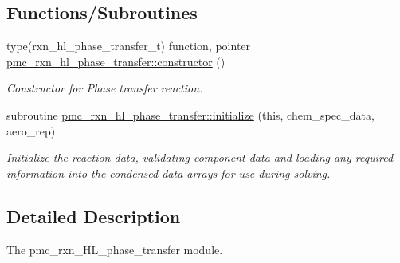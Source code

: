 \subsection*{Functions/\+Subroutines}
\begin{DoxyCompactItemize}
\item 
type(rxn\+\_\+hl\+\_\+phase\+\_\+transfer\+\_\+t) function, pointer \mbox{\hyperlink{namespacepmc__rxn__hl__phase__transfer_a1d307b730caaec01f18e464b315042a1}{pmc\+\_\+rxn\+\_\+hl\+\_\+phase\+\_\+transfer\+::constructor}} ()
\begin{DoxyCompactList}\small\item\em Constructor for Phase transfer reaction. \end{DoxyCompactList}\item 
subroutine \mbox{\hyperlink{namespacepmc__rxn__hl__phase__transfer_a0a981521812601400c9e9d40e803e40e}{pmc\+\_\+rxn\+\_\+hl\+\_\+phase\+\_\+transfer\+::initialize}} (this, chem\+\_\+spec\+\_\+data, aero\+\_\+rep)
\begin{DoxyCompactList}\small\item\em Initialize the reaction data, validating component data and loading any required information into the condensed data arrays for use during solving. \end{DoxyCompactList}\end{DoxyCompactItemize}


\subsection{Detailed Description}
The pmc\+\_\+rxn\+\_\+\+H\+L\+\_\+phase\+\_\+transfer module. 

